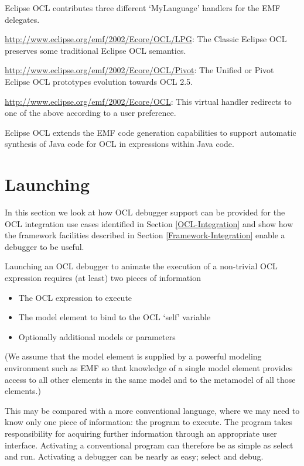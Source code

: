 \documentclass[a4paper]{article}
\begin{document}
Eclipse OCL contributes three different `MyLanguage' handlers for the EMF delegates.

\url{http://www.eclipse.org/emf/2002/Ecore/OCL/LPG}: The Classic Eclipse OCL preserves some traditional Eclipse OCL semantics.

\url{http://www.eclipse.org/emf/2002/Ecore/OCL/Pivot}: The Unified or Pivot Eclipse OCL prototypes evolution towards OCL 2.5.

\url{http://www.eclipse.org/emf/2002/Ecore/OCL}: This virtual handler redirects to one of the above according to a user preference.

Eclipse OCL extends the EMF code generation capabilities to support automatic synthesis of Java code for OCL in expressions within Java code.
 
\section{Launching}\label{Launching}

In this section we look at how OCL debugger support can be provided for the OCL integration use cases identified in Section \ref{OCL-Integration} and show how the framework facilities described in Section \ref{Framework-Integration} enable a debugger to be useful.

Launching an OCL debugger to animate the execution of a non-trivial OCL expression requires (at least) two pieces of information
\begin{itemize}
\item The OCL expression to execute
\item The model element to bind to the OCL `self' variable
\item Optionally additional models or parameters
\end{itemize}

(We assume that the model element is supplied by a powerful modeling environment such as EMF so that knowledge of a single model element provides access to all other elements in the same model and to the metamodel of all those elements.) 

This may be compared with a more conventional language, where we may need to know only one piece of information: the program to execute. The program takes responsibility for acquiring further information through an appropriate user interface. Activating a conventional program can therefore be as simple as select and run. Activating a debugger can be nearly as easy; select and debug.
\end{document}

